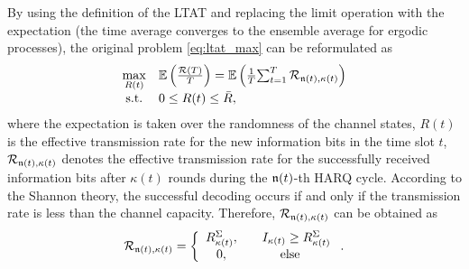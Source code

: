 \documentclass[lettersize,journal]{IEEEtran}
\begin{document}
By using the definition of the LTAT and replacing the limit operation with the expectation (the time average converges to the ensemble average for ergodic processes), the original problem \eqref{eq:ltat_max} can be reformulated as
\begin{equation}\label{eq:ltat_max_ref}
\begin{array}{*{20}{c l}}
{\mathop {\max }\limits_{{R{(t)}}} }& \mathbb E \left(\frac{\mathcal R(T)}{T} \right)=\mathbb E \left(\frac{1}{T}{{\sum\nolimits_{t = 1}^{T} {{\mathcal R_{\frak{n}(t),\kappa(t)}}} }}\right)\\
{{\rm{s}}{\rm{.t}}{\rm{.}}}&{0 \le {R{(t)}} \le \bar R},
\end{array}
\end{equation}
where the expectation is taken over the randomness of the channel states, ${R{(t)}}$ is the effective transmission rate for the new information bits in the time slot $t$, %
${{\mathcal R_{\frak{n}(t),\kappa(t)}}}$ denotes the effective transmission rate for the successfully received information bits after $\kappa(t)$ rounds during the $\frak{n}(t)$-th HARQ cycle. According to the Shannon theory, the successful decoding occurs if and only if the transmission rate is less than the channel capacity. Therefore, ${{\mathcal R_{\frak{n}(t),\kappa(t)}}}$ can be obtained as
\begin{equation}\label{eqn:Throughput}
    {{\mathcal R_{\frak{n}(t),\kappa(t)}}} = \left\{ {\begin{array}{*{20}{c}}
        {R^\Sigma_{\kappa(t)} ,}&{\quad I_{\kappa(t)}  \ge R^\Sigma_{\kappa(t)}}\\
        {0,}&{{\rm{else}}}
        \end{array}} \right..
\end{equation}
\end{document}

